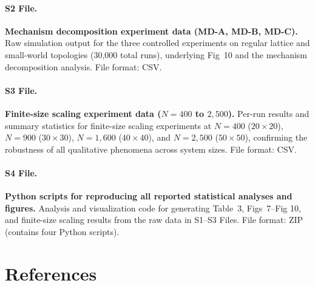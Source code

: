 \documentclass[10pt,letterpaper]{article}
\begin{document}
\paragraph*{S2 File.}
\label{S2_File}
{\bf Mechanism decomposition experiment data (MD-A, MD-B, MD-C).} Raw simulation output for the three controlled experiments on regular lattice and small-world topologies (30,000 total runs), underlying Fig~10 and the mechanism decomposition analysis. File format: CSV.

\paragraph*{S3 File.}
\label{S3_File}
{\bf Finite-size scaling experiment data ($N = 400$ to $2{,}500$).} Per-run results and summary statistics for finite-size scaling experiments at $N = 400$ ($20 \times 20$), $N = 900$ ($30 \times 30$), $N = 1{,}600$ ($40 \times 40$), and $N = 2{,}500$ ($50 \times 50$), confirming the robustness of all qualitative phenomena across system sizes. File format: CSV.

\paragraph*{S4 File.}
\label{S4_File}
{\bf Python scripts for reproducing all reported statistical analyses and figures.} Analysis and visualization code for generating Table~3, Figs~7--Fig 10, and finite-size scaling results from the raw data in S1--S3 Files. File format: ZIP (contains four Python scripts).

\section*{References}
\end{document}
